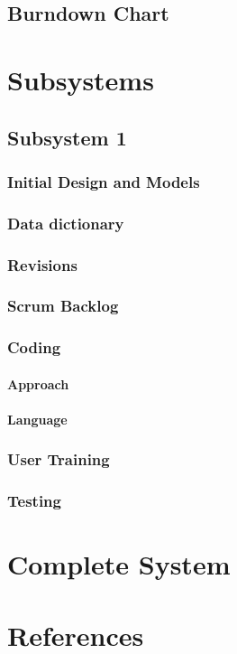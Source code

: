 \documentclass{article}
\begin{document}
\subsection{Burndown Chart}

\section{Subsystems}
\subsection{Subsystem 1}
\subsubsection{Initial Design and Models}
\subsubsection{Data dictionary}
\subsubsection{Revisions}
\subsubsection{Scrum Backlog } %
\subsubsection{Coding}
\paragraph{Approach}
\paragraph{Language}
\subsubsection{User Training}
\subsubsection{Testing}
\section{Complete System}

\section{References}



\end{document}
